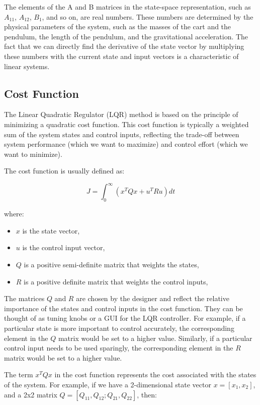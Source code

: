 \documentclass[11pt,twocolumn,twoside,lineno]{pnas-new}
\begin{document}
The elements of the A and B matrices in the state-space representation, such as \(A_{11}\), \(A_{12}\), \(B_{1}\), and so on, are real numbers. These numbers are determined by the physical parameters of the system, such as the masses of the cart and the pendulum, the length of the pendulum, and the gravitational acceleration. The fact that we can directly find the derivative of the state vector by multiplying these numbers with the current state and input vectors is a characteristic of linear systems.


\subsection{Cost Function}
The Linear Quadratic Regulator (LQR) method is based on the principle of minimizing a quadratic cost function. This cost function is typically a weighted sum of the system states and control inputs, reflecting the trade-off between system performance (which we want to maximize) and control effort (which we want to minimize).

The cost function is usually defined as:

\begin{equation}
J = \int_{0}^{\infty} (x^TQx + u^TRu) dt
\end{equation}

where:
\begin{itemize}
    \item \(x\) is the state vector,
    \item \(u\) is the control input vector,
    \item \(Q\) is a positive semi-definite matrix that weights the states,
    \item \(R\) is a positive definite matrix that weights the control inputs,
\end{itemize}

The matrices \(Q\) and \(R\) are chosen by the designer and reflect the relative importance of the states and control inputs in the cost function. They can be thought of as tuning knobs or a GUI for the LQR controller. For example, if a particular state is more important to control accurately, the corresponding element in the \(Q\) matrix would be set to a higher value. Similarly, if a particular control input needs to be used sparingly, the corresponding element in the \(R\) matrix would be set to a higher value.

The term \(x^TQx\) in the cost function represents the cost associated with the states of the system. For example, if we have a 2-dimensional state vector \(x = [x_1, x_2]\), and a 2x2 matrix \(Q = [Q_{11}, Q_{12}; Q_{21}, Q_{22}]\), then:
\end{document}
